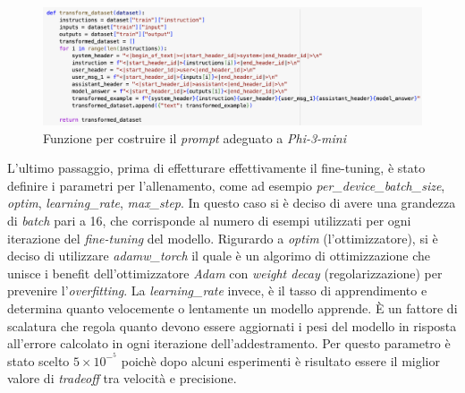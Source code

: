     \begin{figure}[htp]
        \centering        
        \includegraphics[width=14.5cm]{img/promptFormat.pdf}
        \caption{Funzione per costruire il \textit{prompt} adeguato a \textit{Phi-3-mini}}
    \end{figure}\newline
    L'ultimo passaggio, prima di effetturare effettivamente il \gls{fine-tuning}, è stato definire i parametri per l'allenamento, come ad esempio \textit{per\_device\_batch\_size}, \textit{optim}, \textit{learning\_rate}, \textit{max\_step}.
    In questo caso si è deciso di avere una grandezza di \textit{batch} pari a 16, che corrisponde al numero di esempi utilizzati per ogni iterazione del \textit{fine-tuning} del modello. 
    Rigurardo a \textit{optim} (l'ottimizzatore), si è deciso di utilizzare \textit{adamw\_torch} il quale è un algorimo di ottimizzazione che unisce i benefit dell'ottimizzatore \textit{Adam} con \textit{weight decay} (regolarizzazione) per prevenire l'\textit{overfitting}.
    La \textit{learning\_rate} invece, è il tasso di apprendimento e determina quanto velocemente o lentamente un modello apprende. È un fattore di scalatura che regola quanto devono essere aggiornati i pesi del modello in risposta all'errore calcolato in ogni iterazione dell'addestramento. Per questo parametro è stato scelto $5\times10^-^5$ poichè dopo alcuni esperimenti è risultato essere il miglior valore di \textit{tradeoff} tra velocità e precisione.

